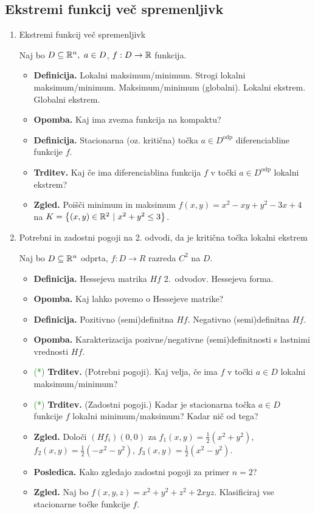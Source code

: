 \subsection{Ekstremi funkcij več spremenljivk}
\begin{enumerate}
    \item Ekstremi funkcij več spremenljivk
    
    Naj bo $D \subseteq \mathbb{R}^n, \ a \in D$, $f: D \to \mathbb{R}$ funkcija.
    
    \begin{itemize}
        \item \textbf{Definicija.} Lokalni maksimum/minimum. Strogi lokalni maksimum/minimum. Maksimum/minimum (globalni). Lokalni ekstrem. Globalni ekstrem.
        \item \textbf{Opomba.} Kaj ima zvezna funkcija na kompaktu?
        \item \textbf{Definicija.} Stacionarna (oz. kritična) točka $a \in D^\text{odp}$ diferenciabline funkcije $f$.
        \item \textbf{Trditev.} Kaj če ima diferenciablina funkcija $f$ v točki $a \in D^\text{odp}$ lokalni ekstrem?
        \item \textbf{Zgled.} Poišči minimum in maksimum $f(x,y) = x^2 - xy + y^2 -3x +4$ na $K = \left\{(x, y) \in \mathbb{R}^2 \ | \ x^2+y^2 \leq 3\right\}$.
    \end{itemize}    

    \item Potrebni in zadostni pogoji na 2. odvodi, da je kritična točka lokalni ekstrem
    
    Naj bo $D \subseteq \mathbb{R}^n$ odprta, $f: D \to R$ razreda $C^2$ na $D$.
    \begin{itemize}
        \item \textbf{Definicija.} Hessejeva matrika $Hf$ 2.\ odvodov. Hessejeva forma.
        \item \textbf{Opomba.} Kaj lahko povemo o Hessejeve matrike?
        \item \textbf{Definicija.} Pozitivno (semi)definitna $Hf$. Negativno (semi)definitna $Hf$.
        \item \textbf{Opomba.} Karakterizacija pozivne/negativne (semi)definitnosti s lastnimi vrednosti $Hf$.
        \item \textcolor{green}{(*)} \textbf{Trditev.} (Potrebni pogoji). Kaj velja, če ima $f$ v točki $a \in D$ lokalni maksimum/minimum?
        \item \textcolor{green}{(*)} \textbf{Trditev.} (Zadostni pogoji.) Kadar je stacionarna točka $a \in D$ funkcije $f$ lokalni minimum/maksimum? Kadar nič od tega?
        \item \textbf{Zgled.} Določi $(Hf_i)(0,0)$ za $f_1(x,y) = \frac{1}{2}(x^2+y^2)$, $f_2(x,y) = \frac{1}{2}(-x^2-y^2)$, $f_3(x,y) = \frac{1}{2}(x^2-y^2)$.
        \item \textbf{Posledica.} Kako zgledajo zadostni pogoji za primer $n = 2$?
        \item \textbf{Zgled.} Naj bo $f(x,y,z) = x^2+y^2+z^2 + 2xyz$. Klasificiraj vse stacionarne točke funkcije $f$.
    \end{itemize}


\end{enumerate}
